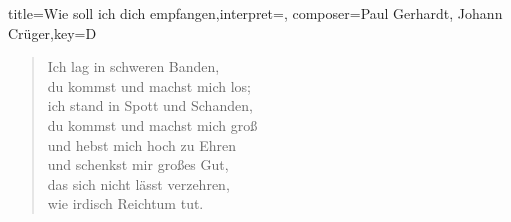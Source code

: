 \documentclass{leadsheet-modern}
\begin{document}
\begin{song}[remember-chords,transpose=-0]{title={Wie soll ich dich empfangen},interpret={}, composer={Paul Gerhardt, Johann Crüger},key={D}}
\begin{verse}
Ich lag in schweren Banden, \\
du kommst und machst mich los; \\
ich stand in Spott und Schanden, \\
du kommst und machst mich groß \\
und hebst mich hoch zu Ehren \\
und schenkst mir großes Gut, \\
das sich nicht lässt verzehren, \\
wie irdisch Reichtum tut.
\end{verse}

\end{song}
\end{document}
